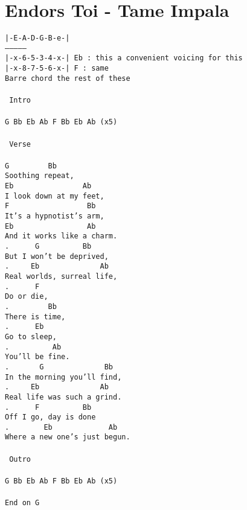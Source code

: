 \newpage
\section{Endors Toi - Tame Impala}
\label{Endors Toi - Tame Impala}
\texttt{|-E-A-D-G-B-e-|\\
---------------\\
|-x-6-5-3-4-x-| Eb : this a convenient voicing for this\\
|-x-8-7-5-6-x-| F : same\\
Barre chord the rest of these\\
\\
\lbrack\ Intro\rbrack\ \\
\\
G\ Bb\ Eb\ Ab\ F\ Bb\ Eb\ Ab\ (x5)\\
\\
\lbrack\ Verse\rbrack\\
\\
G\ \ \ \ \ \ \ \ \ Bb\\
Soothing\ repeat,\\
Eb\ \ \ \ \ \ \ \ \ \ \ \ \ \ \ \ Ab\\
I\ look\ down\ at\ my\ feet,\ \\
F\ \ \ \ \ \ \ \ \ \ \ \ \ \ \ \ \ \ Bb\\
It's\ a\ hypnotist's\ arm,\ \\
Eb\ \ \ \ \ \ \ \ \ \ \ \ \ \ \ \ \ Ab\\
And\ it\ works\ like\ a\ charm.\\
. \ \ \ \ \ G\ \ \ \ \ \ \ \ \ \ Bb\\
But\ I\ won't\ be\ deprived,\ \\
. \ \ \ \ Eb\ \ \ \ \ \ \ \ \ \ \ \ \ \ Ab\\
Real\ worlds,\ surreal\ life,\ \\
. \ \ \ \ \ F\\
Do\ or\ die,\ \\
. \ \ \ \ \ \ \ \ Bb\\
There\ is\ time,\ \\
. \ \ \ \ \ Eb\\
Go\ to\ sleep,\ \\
. \ \ \ \ \ \ \ \ \ Ab\\
You'll\ be\ fine.\\
. \ \ \ \ \ \ G\ \ \ \ \ \ \ \ \ \ \ \ \ \ Bb\\
In\ the\ morning\ you'll\ find,\ \\
. \ \ \ \ Eb\ \ \ \ \ \ \ \ \ \ \ \ \ \ Ab\\
Real\ life\ was\ such\ a\ grind.\\
. \ \ \ \ \ F\ \ \ \ \ \ \ \ \ \ Bb\\
Off\ I\ go,\ day\ is\ done\\
. \ \ \ \ \ \ \ Eb\ \ \ \ \ \ \ \ \ \ \ \ \ Ab\\
Where\ a\ new\ one's\ just\ begun.\\
\\
\lbrack\ Outro\rbrack\\
\\
G\ Bb\ Eb\ Ab\ F\ Bb\ Eb\ Ab\ (x5)\\
\\
End\ on\ G\ }

